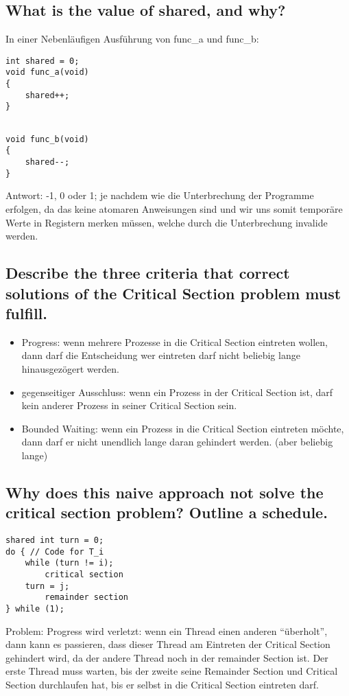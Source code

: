 \subsection{What is the value of shared, and why?}
In einer Nebenläufigen Ausführung von func\_a und func\_b:

\lstset{language=C}
\begin{minipage}{.5\textwidth}
\begin{lstlisting}
int shared = 0;
void func_a(void)
{
    shared++;
}
\end{lstlisting}
\end{minipage}
\begin{minipage}{.5\textwidth}
\begin{lstlisting}

void func_b(void)
{
    shared--;
}
\end{lstlisting}
\end{minipage}

Antwort: -1, 0 oder 1; je nachdem wie die Unterbrechung der Programme erfolgen, da das keine atomaren Anweisungen sind und wir uns somit temporäre Werte in Registern merken müssen, welche durch die Unterbrechung invalide werden.

\subsection{Describe the three criteria that correct solutions of the Critical Section problem must fulfill.}
\begin{itemize}
    \item Progress: wenn mehrere Prozesse in die Critical Section eintreten wollen, dann darf die Entscheidung wer eintreten darf nicht beliebig lange hinausgezögert werden.
    \item gegenseitiger Ausschluss: wenn ein Prozess in der Critical Section ist, darf kein anderer Prozess in seiner Critical Section sein.
    \item Bounded Waiting: wenn ein Prozess in die Critical Section eintreten möchte, dann darf er nicht unendlich lange daran gehindert werden. (aber beliebig lange)
\end{itemize}

\subsection{Why does this naive approach not solve the critical section problem? Outline a schedule.}
\begin{lstlisting}
shared int turn = 0;
do { // Code for T_i
    while (turn != i);
        critical section
    turn = j;
        remainder section
} while (1);
\end{lstlisting}
Problem: Progress wird verletzt: wenn ein Thread einen anderen ``überholt'', dann kann es passieren, dass dieser Thread am Eintreten der Critical Section gehindert wird, da der andere Thread noch in der remainder Section ist.
Der erste Thread muss warten, bis der zweite seine Remainder Section und Critical Section durchlaufen hat, bis er selbst in die Critical Section eintreten darf.

